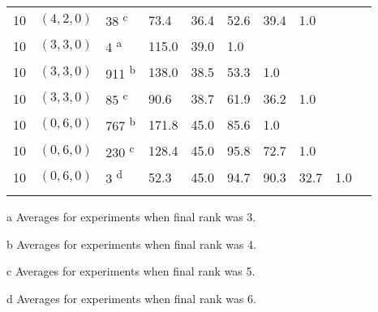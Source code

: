 \begin{table*}[ht]
\begin{threeparttable}
\begin{tabular}{llllllllll}
      10  & $(4, 2, 0)$          & 38 \textsuperscript{c}  & 73.4  & 36.4    & 52.6    & 39.4    & 1.0     &         \\
      10  & $(3, 3, 0)$          & 4 \textsuperscript{a}   & 115.0 & 39.0    & 1.0     &         &         &         \\
      10  & $(3, 3, 0)$          & 911 \textsuperscript{b} & 138.0 & 38.5    & 53.3    & 1.0     &         &         \\
      10  & $(3, 3, 0)$          & 85 \textsuperscript{c}  & 90.6  & 38.7    & 61.9    & 36.2    & 1.0     &         \\
      10  & $(0, 6, 0)$          & 767 \textsuperscript{b} & 171.8 & 45.0    & 85.6    & 1.0     &         &         \\
      10  & $(0, 6, 0)$          & 230 \textsuperscript{c} & 128.4 & 45.0    & 95.8    & 72.7    & 1.0     &         \\
      10  & $(0, 6, 0)$          & 3 \textsuperscript{d}   & 52.3  & 45.0    & 94.7    & 90.3    & 32.7    & 1.0     \\
      \bottomrule\addlinespace[1ex]
    \end{tabular}
    \begin{tablenotes}\footnotesize
      \item [a] Averages for experiments when final rank was 3.
      \item [b] Averages for experiments when final rank was 4.
      \item [c] Averages for experiments when final rank was 5.
      \item [d] Averages for experiments when final rank was 6.
    \end{tablenotes}
  \end{threeparttable}
\end{table*}